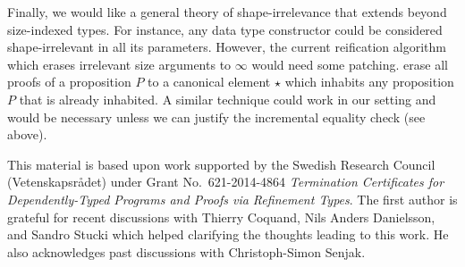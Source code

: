 \documentclass[acmlarge,review,anonymous]{acmart}\settopmatter{printfolios=true}
\begin{document}
Finally, we would like a general theory of shape-irrelevance that extends beyond size-indexed types.  For instance, any data type constructor could be considered shape-irrelevant in all its parameters.  However, the current reification algorithm which erases irrelevant size arguments to $\infty$ would need some patching.  \citet{abelCoquandPagano:lmcs11} erase all proofs of a proposition $P$ to a canonical element $\star$ which inhabits any proposition $P$ that is already inhabited.  A similar technique could work in our setting and would be necessary unless we can justify the incremental equality check (see above).






\begin{acks}                            %
  This material is based upon work supported by the
  Swedish Research Council (Vetenskapsr\aa{}det)
  under Grant
  No.~621-2014-4864 \emph{Termination Certificates for Dependently-Typed Programs and Proofs via Refinement Types}.
  The first author is grateful for recent discussions with Thierry Coquand, Nils Anders Danielsson, and Sandro Stucki
  which helped clarifying the thoughts leading to this work.
  He also acknowledges past discussions with Christoph-Simon Senjak.
\end{acks}






\end{document}
